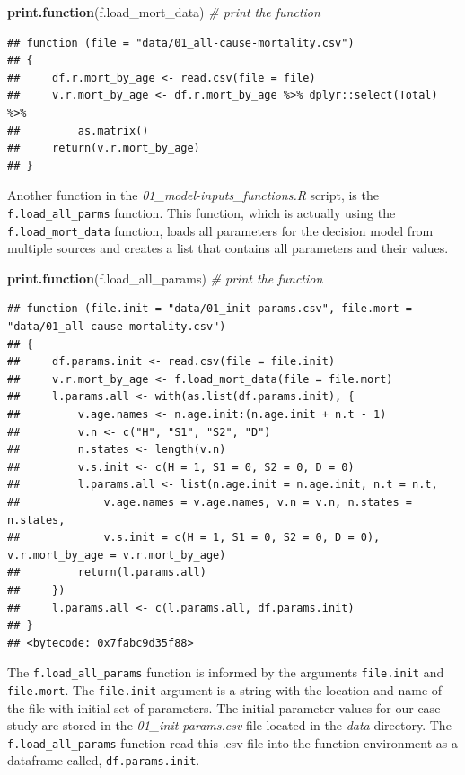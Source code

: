 \documentclass[]{article}
\newenvironment{Shaded}{\begin{snugshade}}{\end{snugshade}}
\newcommand{\KeywordTok}[1]{\textcolor[rgb]{0.13,0.29,0.53}{\textbf{#1}}}
\newcommand{\CommentTok}[1]{\textcolor[rgb]{0.56,0.35,0.01}{\textit{#1}}}
\newcommand{\NormalTok}[1]{#1}
\begin{document}
\begin{Shaded}
\begin{Highlighting}[]
\KeywordTok{print.function}\NormalTok{(f.load_mort_data) }\CommentTok{# print the function}
\end{Highlighting}
\end{Shaded}

\begin{verbatim}
## function (file = "data/01_all-cause-mortality.csv") 
## {
##     df.r.mort_by_age <- read.csv(file = file)
##     v.r.mort_by_age <- df.r.mort_by_age %>% dplyr::select(Total) %>% 
##         as.matrix()
##     return(v.r.mort_by_age)
## }
\end{verbatim}

Another function in the \emph{01\_model-inputs\_functions.R} script, is
the \texttt{f.load\_all\_parms} function. This function, which is
actually using the \texttt{f.load\_mort\_data} function, loads all
parameters for the decision model from multiple sources and creates a
list that contains all parameters and their values.

\begin{Shaded}
\begin{Highlighting}[]
\KeywordTok{print.function}\NormalTok{(f.load_all_params)  }\CommentTok{# print the function}
\end{Highlighting}
\end{Shaded}

\begin{verbatim}
## function (file.init = "data/01_init-params.csv", file.mort = "data/01_all-cause-mortality.csv") 
## {
##     df.params.init <- read.csv(file = file.init)
##     v.r.mort_by_age <- f.load_mort_data(file = file.mort)
##     l.params.all <- with(as.list(df.params.init), {
##         v.age.names <- n.age.init:(n.age.init + n.t - 1)
##         v.n <- c("H", "S1", "S2", "D")
##         n.states <- length(v.n)
##         v.s.init <- c(H = 1, S1 = 0, S2 = 0, D = 0)
##         l.params.all <- list(n.age.init = n.age.init, n.t = n.t, 
##             v.age.names = v.age.names, v.n = v.n, n.states = n.states, 
##             v.s.init = c(H = 1, S1 = 0, S2 = 0, D = 0), v.r.mort_by_age = v.r.mort_by_age)
##         return(l.params.all)
##     })
##     l.params.all <- c(l.params.all, df.params.init)
## }
## <bytecode: 0x7fabc9d35f88>
\end{verbatim}

The \texttt{f.load\_all\_params} function is informed by the arguments
\texttt{file.init} and \texttt{file.mort}. The \texttt{file.init}
argument is a string with the location and name of the file with initial
set of parameters. The initial parameter values for our case-study are
stored in the \emph{01\_init-params.csv} file located in the \emph{data}
directory. The \texttt{f.load\_all\_params} function read this .csv file
into the function environment as a dataframe called,
\texttt{df.params.init}.
\end{document}
